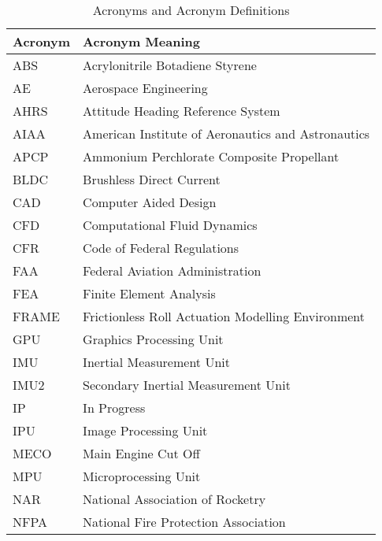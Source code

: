 \documentclass[class=article, crop=false]{standalone}
\begin{document}
\begin{table}[H]
\centering
\caption{Acronyms and Acronym Definitions}
\label{acronymlookup}
\begin{tabular}{|l|l|}
\hline
\bf{Acronym} & \bf{Acronym Meaning}                                   \\ \hline
ABS     & Acrylonitrile Botadiene Styrene                   \\ \hline
AE      & Aerospace Engineering                             \\ \hline
AHRS    & Attitude Heading Reference System                 \\ \hline
AIAA    & American Institute of Aeronautics and Astronautics                \\ \hline
APCP    & Ammonium Perchlorate Composite Propellant         \\ \hline
BLDC    & Brushless Direct Current                          \\ \hline
CAD     & Computer Aided Design                             \\ \hline
CFD     & Computational Fluid Dynamics                      \\ \hline
CFR     & Code of Federal Regulations                       \\ \hline
FAA     & Federal Aviation Administration                   \\ \hline
FEA     & Finite Element Analysis                           \\ \hline
FRAME   & Frictionless Roll Actuation Modelling Environment \\ \hline
GPU     & Graphics Processing Unit                          \\ \hline
IMU     & Inertial Measurement Unit                         \\ \hline
IMU2    & Secondary Inertial Measurement Unit               \\ \hline
IP      & In Progress                                       \\ \hline
IPU     & Image Processing Unit                             \\ \hline
MECO    & Main Engine Cut Off                               \\ \hline
MPU     & Microprocessing Unit                              \\ \hline
NAR     & National Association of Rocketry                  \\ \hline
NFPA    & National Fire Protection Association              \\ \hline

\end{tabular}
\end{table}
\end{document}
